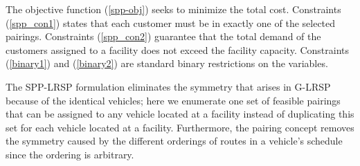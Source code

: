 \documentclass[11pt]{article}
\begin{document}
The objective function (\ref{spp-obj}) seeks to minimize the total cost.
Constraints (\ref{spp_con1}) 
states that each customer must be in exactly one of the selected pairings.
Constraints (\ref{spp_con2}) 
guarantee that the total demand of the customers assigned to
a facility does not exceed the facility capacity.  
Constraints (\ref{binary1}) and (\ref{binary2}) are standard binary restrictions on the 
variables. 

The SPP-LRSP formulation eliminates the symmetry that arises in G-LRSP because of the
identical vehicles; here we enumerate one set of feasible pairings that can be assigned to any vehicle 
located at a facility instead of duplicating this set for each vehicle located at a facility. 
Furthermore, the pairing concept removes the symmetry caused by the different orderings of routes in a 
vehicle's schedule since the ordering is arbitrary.
\end{document}
